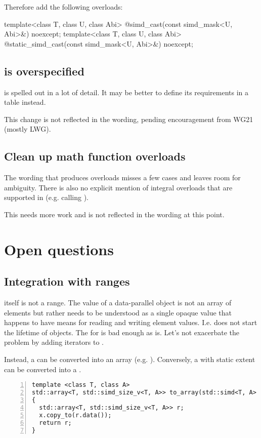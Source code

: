 Therefore add the following overloads:
\begin{wgText}
\begin{codeblock}
  template<class T, class U, class Abi> @\seebelow@ simd_cast(const simd_mask<U, Abi>&) noexcept;
  template<class T, class U, class Abi> @\seebelow@ static_simd_cast(const simd_mask<U, Abi>&) noexcept;
\end{codeblock}
\end{wgText}

\subsection{ is overspecified}
 is spelled out in a lot of detail.
It may be better to define its requirements in a table instead.

This change is not reflected in the wording, pending encouragement from WG21 (mostly LWG).

\subsection{Clean up math function overloads}
The wording that produces  overloads misses a few cases and leaves room for ambiguity.
There is also no explicit mention of integral overloads that are supported in  (e.g.  calling ).

This needs more work and is not reflected in the wording at this point.


\section{Open questions}

\subsection{Integration with ranges}
 itself is not a range.
The value of a data-parallel object is not an array of elements but rather needs to be understood as a single opaque value that happens to have means for reading and writing element values.
I.e.  does not start the lifetime of  objects.
The  for  is bad enough as is.
Let's not exacerbate the problem by adding iterators to .

Instead, a  can be converted into an array (e.g. ).
Conversely, a \std{} with static extent can be converted into a \std{}.
\begin{lstlisting}[numbers=left,float={hbtp},label=lst:simdtoarray,caption={
  \code{simd} to \code{array} conversion
}]
template <class T, class A>
std::array<T, std::simd_size_v<T, A>> to_array(std::simd<T, A> x)
{
  std::array<T, std::simd_size_v<T, A>> r;
  x.copy_to(r.data());
  return r;
}
\end{lstlisting}

